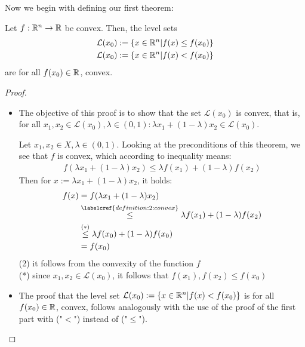 Now we begin with defining our first theorem:

\begin{satz}
	Let $f:\mathbb{R}^n\to\mathbb{R}$ be convex. Then, the level sets
	\begin{align*}
	\mathcal{L}(x_0) &:= \{ x\in\mathbb{R}^n | f(x)\leq f(x_0) \}  \\
	\mathcal{L}(x_0) &:= \{ x\in\mathbb{R}^n | f(x) < f(x_0) \}
	\end{align*}
	are for all $f(x_0)\in\mathbb{R}$, convex.
\end{satz}

\begin{proof}
	\begin{itemize}
		\item The objective of this proof is to show that the set $\mathcal{L}(x_0)$ is convex, that is, for all $x_1, x_2 \in \mathcal{L}(x_0), \lambda\in (0,1) : \lambda x_1 + (1-\lambda) x_2 \in\mathcal{L}(x_0)$.
		
		Let $x_1, x_2 \in X, \lambda\in (0,1)$. Looking at the preconditions of this theorem, we see that $f$ is convex, which according to inequality  means:  %
		\begin{align*}
		f ( \lambda x_1 + (1-\lambda) x_2 ) \leq \lambda f(x_1) + (1-\lambda)f(x_2)
		\end{align*}
		Then for $x := \lambda x_1 + (1-\lambda) x_2$, it holds:
		\begin{align*}
		f(x) &= f(\lambda x_1 + (1-\lambda) x_2) \\
		&\overset{\labelcref{definition:2:convex}}{\leq} \lambda f(x_1) + (1-\lambda)f(x_2)\\
		&\overset{(*)}{\leq} \lambda f(x_0) + (1-\lambda) f(x_0)\\
		&= f(x_0)
		\end{align*}
		(2) it follows from the convexity of the function $f$ \\ 
		(*) since $x_1, x_2 \in \mathcal{L}(x_0)$, it follows that $f(x_1), f(x_2) \leq f(x_0)$
		\item The proof that the level set $\mathcal{L}(x_0) := \{ x \in \mathbb{R}^n | f(x) < f(x_0) \}$ is for all $f(x_0) \in \mathbb{R}$, convex, follows analogously with the use of the proof of the first part with ("$<$") instead of ("$\leq$"). 
	\end{itemize}
\end{proof}

